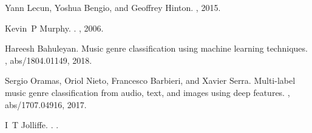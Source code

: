 \documentclass[twocolumn]{article}
\begin{document}
\begin{thebibliography}{1}
Yann Lecun, Yoshua Bengio, and Geoffrey Hinton.
, 2015.

Kevin~P Murphy.
.
, 2006.

Hareesh Bahuleyan.
\newblock Music genre classification using machine learning techniques.
, abs/1804.01149, 2018.

Sergio Oramas, Oriol Nieto, Francesco Barbieri, and Xavier Serra.
\newblock Multi-label music genre classification from audio, text, and images
  using deep features.
, abs/1707.04916, 2017.

I~T Jolliffe.
.
.


\end{thebibliography}
\end{document}
